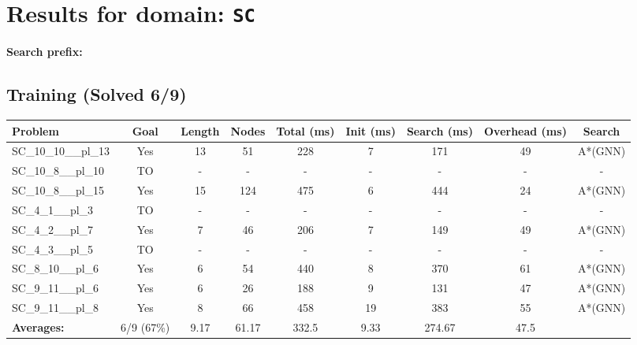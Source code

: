 \documentclass{article}
\begin{document}
\section*{Results for domain: \texttt{SC}}
\textbf{Search prefix:} 
\\[0.5cm]
\subsection*{Training (Solved 6/9)}
\begin{tabular}{lcccccccc}
\toprule
Problem & Goal & Length & Nodes & Total (ms) & Init (ms) & Search (ms) & Overhead (ms) & Search \\
\midrule
SC\_10\_10\_\_pl\_13 & Yes & 13 & 51 & 228 & 7 & 171 & 49 & A*(GNN) \\
SC\_10\_8\_\_pl\_10 & TO & - & - & - & - & - & - & - \\
SC\_10\_8\_\_pl\_15 & Yes & 15 & 124 & 475 & 6 & 444 & 24 & A*(GNN) \\
SC\_4\_1\_\_pl\_3 & TO & - & - & - & - & - & - & - \\
SC\_4\_2\_\_pl\_7 & Yes & 7 & 46 & 206 & 7 & 149 & 49 & A*(GNN) \\
SC\_4\_3\_\_pl\_5 & TO & - & - & - & - & - & - & - \\
SC\_8\_10\_\_pl\_6 & Yes & 6 & 54 & 440 & 8 & 370 & 61 & A*(GNN) \\
SC\_9\_11\_\_pl\_6 & Yes & 6 & 26 & 188 & 9 & 131 & 47 & A*(GNN) \\
SC\_9\_11\_\_pl\_8 & Yes & 8 & 66 & 458 & 19 & 383 & 55 & A*(GNN) \\
\textbf{Averages:} & 6/9 (67\%) & 9.17 & 61.17 & 332.5 & 9.33 & 274.67 & 47.5 & \\
\bottomrule
\end{tabular}
\\[0.7cm]
\end{document}
